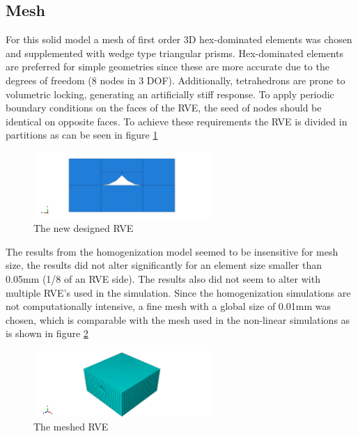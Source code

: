 \subsection{Mesh}
For this solid model a mesh of first order 3D hex-dominated elements was chosen and supplemented with wedge type triangular prisms. Hex-dominated elements are preferred for simple geometries since these are more accurate due to the degrees of freedom (8 nodes in 3 DOF). Additionally, tetrahedrons are prone to volumetric locking, generating an artificially stiff response. 
To apply periodic boundary conditions on the faces of the RVE, the seed of nodes should be identical on opposite faces. To achieve these requirements the RVE is divided in partitions as can be seen in figure \ref{fig:partition}
\begin{figure}[H]
    \centering
    \includegraphics[width=0.60\textwidth]{chapter_6_Elasticmodelling/figures/partition.png}
    \caption{The new designed RVE}
    \label{fig:partition}
\end{figure}
The results from the homogenization model seemed to be insensitive for mesh size, the results did not alter significantly for an element size smaller than 0.05mm (1/8 of an RVE side). The results also did not seem to alter with multiple RVE's used in the simulation. Since the homogenization simulations are not computationally intensive, a fine mesh with a global size of 0.01mm was chosen, which is comparable with the mesh used in the non-linear simulations as is shown in figure \ref{fig:mesh}

\begin{figure}[H]
    \centering
    \includegraphics[width=0.60\textwidth]{chapter_6_Elasticmodelling/figures/mesh.png}
    \caption{The meshed RVE}
    \label{fig:mesh}
\end{figure}
